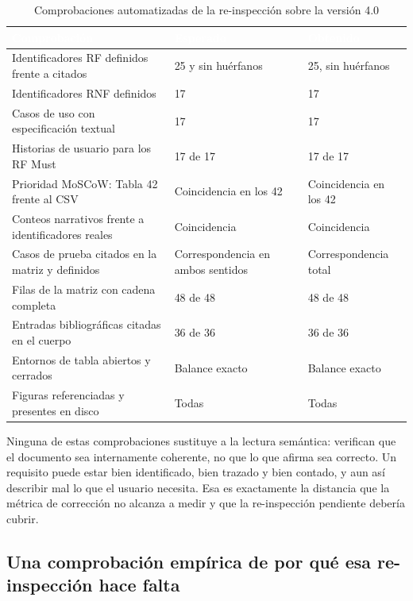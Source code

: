 \begin{table}[H]
\centering
\small
\begin{tabular}{|p{6.9cm}|p{3.1cm}|p{3.4cm}|}
\hline
\cellcolor{sigagreen}\textcolor{white}{\textbf{Comprobaci\'on}} & \cellcolor{sigagreen}\textcolor{white}{\textbf{Esperado}} & \cellcolor{sigagreen}\textcolor{white}{\textbf{Obtenido}} \\ \hline
Identificadores RF definidos frente a citados & 25 y sin hu\'erfanos & 25, sin hu\'erfanos \\ \hline
Identificadores RNF definidos & 17 & 17 \\ \hline
Casos de uso con especificaci\'on textual & 17 & 17 \\ \hline
Historias de usuario para los RF Must & 17 de 17 & 17 de 17 \\ \hline
Prioridad MoSCoW: Tabla 42 frente al CSV & Coincidencia en los 42 & Coincidencia en los 42 \\ \hline
Conteos narrativos frente a identificadores reales & Coincidencia & Coincidencia \\ \hline
Casos de prueba citados en la matriz y definidos & Correspondencia en ambos sentidos & Correspondencia total \\ \hline
Filas de la matriz con cadena completa & 48 de 48 & 48 de 48 \\ \hline
Entradas bibliogr\'aficas citadas en el cuerpo & 36 de 36 & 36 de 36 \\ \hline
Entornos de tabla abiertos y cerrados & Balance exacto & Balance exacto \\ \hline
Figuras referenciadas y presentes en disco & Todas & Todas \\ \hline
\end{tabular}
\caption{Comprobaciones automatizadas de la re-inspecci\'on sobre la versi\'on 4.0}
\label{tab:reinspeccion}
\end{table}

Ninguna de estas comprobaciones sustituye a la lectura sem\'antica: verifican que el documento sea internamente coherente, no que lo que afirma sea correcto. Un requisito puede estar bien identificado, bien trazado y bien contado, y aun as\'i describir mal lo que el usuario necesita. Esa es exactamente la distancia que la m\'etrica de correcci\'on no alcanza a medir y que la re-inspecci\'on pendiente deber\'ia cubrir.

\subsection{Una comprobaci\'on emp\'irica de por qu\'e esa re-inspecci\'on hace falta}

